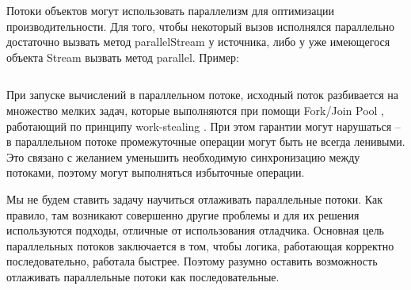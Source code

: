 Потоки объектов могут использовать параллелизм для оптимизации производительности. Для того, чтобы некоторый вызов исполнялся параллельно достаточно вызвать метод parallelStream у источника, либо у уже имеющегося объекта Stream вызвать метод parallel. Пример: 
\inputminted{java}{chapter2/code/ParallelStream.java}
При запуске вычислений в параллельном потоке, исходный поток разбивается на множество мелких задач, которые выполняются при помощи Fork/Join Pool \cite{java:forkjoin}, работающий по принципу work-stealing \cite{wiki:worksteal}. При этом гарантии могут нарушаться -- в параллельном потоке промежуточные операции могут быть не всегда ленивыми. Это связано с желанием уменьшить необходимую синхронизацию между потоками, поэтому могут выполняться избыточные операции.

Мы не будем ставить задачу научиться отлаживать параллельные потоки. Как правило, там возникают совершенно другие проблемы и для их решения используются подходы, отличные от использования отладчика. Основная цель параллельных потоков заключается в том, чтобы логика, работающая корректно последовательно, работала быстрее. Поэтому разумно оставить возможность отлаживать параллельные потоки как последовательные.